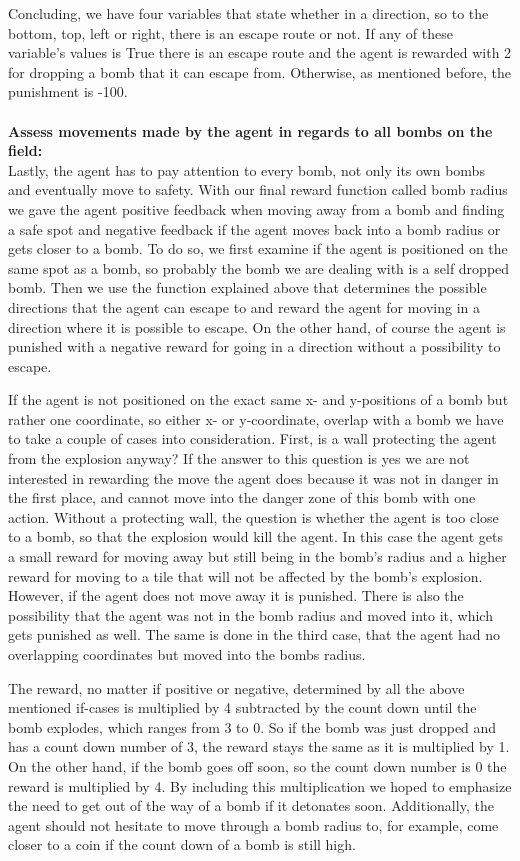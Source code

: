 Concluding, we have four variables that state whether in a direction, so to the bottom, top, left or right, there is an escape route or not. If any of these variable's values is True there is an escape route and the agent is rewarded with 2 for dropping a bomb that it can escape from. Otherwise, as mentioned before, the punishment is -100.
\\ \\
\textbf{Assess movements made by the agent in regards to all bombs on the field:} \\

\noindent Lastly, the agent has to pay attention to every bomb, not only its own bombs and eventually move to safety. With our final reward function called bomb radius we gave the agent positive feedback when moving away from a bomb and finding a safe spot and negative feedback if the agent moves back into a bomb radius or gets closer to a bomb. To do so, we first examine if the agent is positioned on the same spot as a bomb, so probably the bomb we are dealing with is a self dropped bomb. Then we use the function explained above that determines the possible directions that the agent can escape to and reward the agent for moving in a direction where it is possible to escape. On the other hand, of course the agent is punished with a negative reward for going in a direction without a possibility to escape. 

If the agent is not positioned on the exact same x- and y-positions of a bomb but rather one coordinate, so either x- or y-coordinate, overlap with a bomb we have to take a couple of cases into consideration. First, is a wall protecting the agent from the explosion anyway? If the answer to this question is yes we are not interested in rewarding the move the agent does because it was not in danger in the first place, and cannot move into the danger zone of this bomb with one action. Without a protecting wall, the question is whether the agent is too close to a bomb, so that the explosion would kill the agent. In this case the agent gets a small reward for moving away but still being in the bomb's radius and a higher reward for moving to a tile that will not be affected by the bomb's explosion. However, if the agent does not move away it is punished. There is also the possibility that the agent was not in the bomb radius and moved into it, which gets punished as well. The same is done in the third case, that the agent had no overlapping coordinates but moved into the bombs radius.

The reward, no matter if positive or negative, determined by all the above mentioned if-cases is multiplied by 4 subtracted by the count down until the bomb explodes, which ranges from 3 to 0. So if the bomb was just dropped and has a count down number of 3, the reward stays the same as it is multiplied by 1. On the other hand, if the bomb goes off soon, so the count down number is 0 the reward is multiplied by 4. By including this multiplication we hoped to emphasize the need to get out of the way of a bomb if it detonates soon. Additionally, the agent should not hesitate to move through a bomb radius to, for example, come closer to a coin if the count down of a bomb is still high.
\\ 

